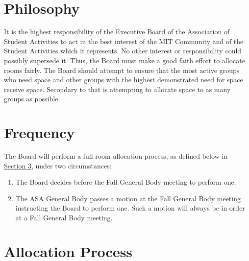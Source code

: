 \documentclass[12pt]{article}
\begin{document}
\newpage

\label{office_and_storage}


\section{Philosophy}
It is the highest responsibility of the Executive Board of the Association of Student Activities to act in the
best interest of the MIT Community and of the Student Activities which it represents. No other interest
or responsibility could possibly supersede it. Thus, the Board must make a good faith effort to allocate
rooms fairly. The Board should attempt to ensure that the most active groups who need space and other
groups with the highest demonstrated need for space receive space. Secondary to that is attempting to
allocate space to as many groups as possible.

\section{Frequency}
\label{art:VII_sect2}

The Board will perform a full room allocation process, as defined below in \hyperref[art:VII_sect3]{Section 3}, under two
circumstances:
\begin{enumerate}
    \item The Board decides before the Fall General Body meeting to perform one.
    \item The ASA General Body passes a motion at the Fall General Body meeting instructing the Board
to perform one. Such a motion will always be in order at a Fall General Body meeting.
\end{enumerate}

\section{Allocation Process}
\label{art:VII_sect3}
\end{document}
